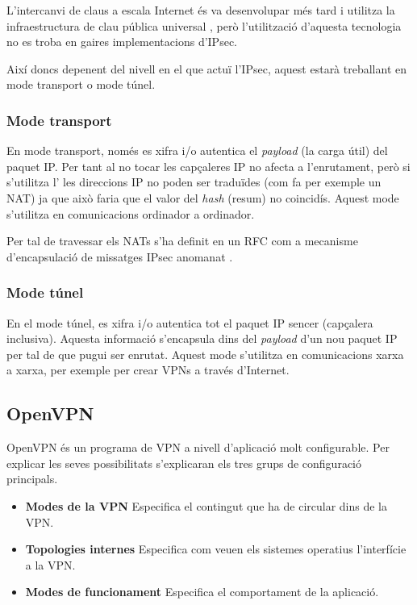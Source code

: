 L'intercanvi de claus a escala Internet és va desenvolupar més tard i utilitza la infraestructura de clau pública universal , però l'utilització d'aquesta tecnologia no es troba en gaires implementacions d'IPsec.

Així doncs depenent del nivell en el que actuï l'IPsec, aquest estarà treballant en mode transport o mode túnel.
\subsubsection{Mode transport}
En mode transport, només es xifra i/o autentica el \emph{payload} (la carga útil) del paquet IP. Per tant al no tocar les capçaleres IP no afecta a l'enrutament, però si s'utilitza l' les direccions IP no poden ser traduïdes (com fa per exemple un NAT) ja que això faria que el valor del \emph{hash} (resum) no coincidís. Aquest mode s'utilitza en comunicacions ordinador a ordinador.

Per tal de travessar els NATs s'ha definit en un RFC com a mecanisme d'encapsulació de missatges IPsec anomanat .
\subsubsection{Mode túnel}
En el mode túnel, es xifra i/o autentica tot el paquet IP sencer (capçalera inclusiva). Aquesta informació s'encapsula dins del \emph{payload} d'un nou paquet IP per tal de que pugui ser enrutat. Aquest mode s'utilitza en comunicacions xarxa a xarxa, per exemple per crear VPNs a través d'Internet.

\subsection{OpenVPN}
OpenVPN és un programa de VPN a nivell d'aplicació molt configurable. Per explicar les seves possibilitats s'explicaran els tres grups de configuració principals.
\begin{itemize}
\item \textbf{Modes de la VPN}
Especifica el contingut que ha de circular dins de la VPN.
\item \textbf{Topologies internes}
Especifica com veuen els sistemes operatius l'interfície a la VPN.
\item \textbf{Modes de funcionament}
Especifica el comportament de la aplicació.
\end{itemize}

